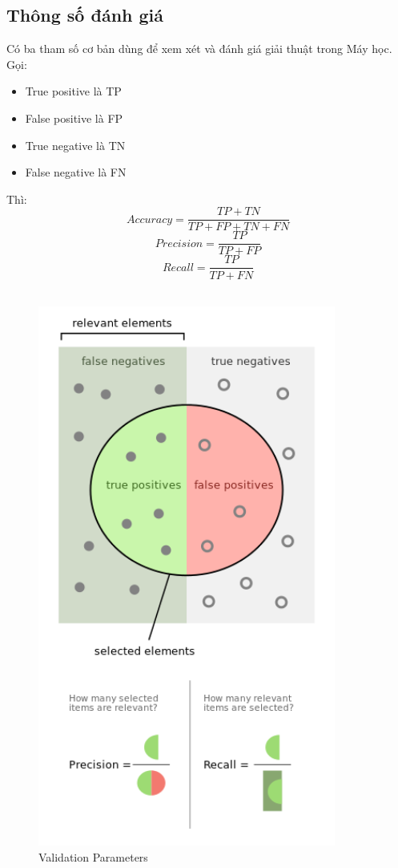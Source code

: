 \subsection{Thông số đánh giá}
Có ba tham số cơ bản dùng để xem xét và đánh giá giải thuật trong Máy học.
Gọi:
\begin{itemize}
\item True positive là TP
\item False positive là FP
\item True negative là TN
\item False negative là FN
\end{itemize}
Thì:\\
\[
  Accuracy = \frac{TP+TN}{TP+FP+TN+FN}
\]
\[
  Precision = \frac{TP}{TP+FP}
\]
\[
  Recall = \frac{TP}{TP+FN}
\]\\
\begin{figure}[h!]
\centering
\includegraphics[height=7in, keepaspectratio=true]{precision_recall.png}
\caption{Validation Parameters}
\end{figure}\\
